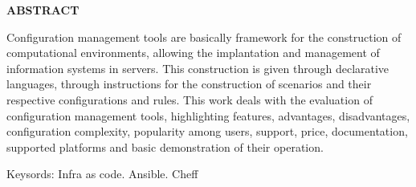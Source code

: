 
{
\begin{newpage}
	\thispagestyle{empty}
	\setlength{\baselineskip}{1.5\baselineskip} %
	\begin{center}
		\textbf{ABSTRACT} \\ [1.5\baselineskip]
	\end{center}
	\singlespace
	\noindent 
	Configuration management tools are basically framework for the construction of computational environments, allowing the implantation and management of information systems in servers. This construction is given through declarative languages, through instructions for the construction of scenarios and their respective configurations and rules.
    This work deals with the evaluation of configuration management tools, highlighting features, advantages, disadvantages, configuration complexity, popularity among users, support, price, documentation, supported platforms and basic demonstration of their operation.
        \vspace{1.5\baselineskip} 
	\par
        \noindent Keysords: {Infra as code. Ansible. Cheff}
\end{newpage}
}
